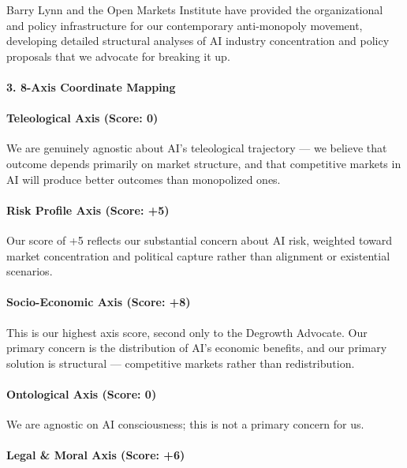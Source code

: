 Barry Lynn and the Open Markets Institute have provided the
organizational and policy infrastructure for our contemporary
anti-monopoly movement, developing detailed structural analyses of AI
industry concentration and policy proposals that we advocate for
breaking it up.

\paragraph{3. 8-Axis Coordinate
Mapping}\label{axis-coordinate-mapping-28}

\paragraph{Teleological Axis (Score:
0)}\label{teleological-axis-score-0-2}

We are genuinely agnostic about AI's teleological trajectory --- we
believe that outcome depends primarily on market structure, and that
competitive markets in AI will produce better outcomes than monopolized
ones.

\paragraph{Risk Profile Axis (Score:
+5)}\label{risk-profile-axis-score-5}

Our score of +5 reflects our substantial concern about AI risk, weighted
toward market concentration and political capture rather than alignment
or existential scenarios.

\paragraph{Socio-Economic Axis (Score:
+8)}\label{socio-economic-axis-score-8}

This is our highest axis score, second only to the Degrowth Advocate.
Our primary concern is the distribution of AI's economic benefits, and
our primary solution is structural --- competitive markets rather than
redistribution.

\paragraph{Ontological Axis (Score:
0)}\label{ontological-axis-score-0-12}

We are agnostic on AI consciousness; this is not a primary concern for
us.

\paragraph{Legal \& Moral Axis (Score:
+6)}\label{legal-moral-axis-score-6-1}

